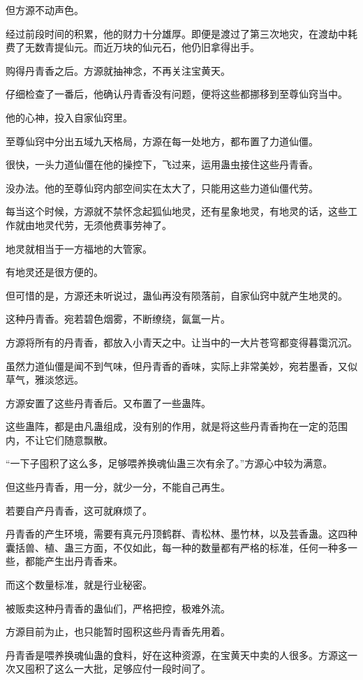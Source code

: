 \begin{this_body}
但方源不动声色。

经过前段时间的积累，他的财力十分雄厚。即便是渡过了第三次地灾，在渡劫中耗费了无数青提仙元。而近万块的仙元石，他仍旧拿得出手。

购得丹青香之后。方源就抽神念，不再关注宝黄天。

仔细检查了一番后，他确认丹青香没有问题，便将这些都挪移到至尊仙窍当中。

他的心神，投入自家仙窍里。

至尊仙窍中分出五域九天格局，方源在每一处地方，都布置了力道仙僵。

很快，一头力道仙僵在他的操控下，飞过来，运用蛊虫接住这些丹青香。

没办法。他的至尊仙窍内部空间实在太大了，只能用这些力道仙僵代劳。

每当这个时候，方源就不禁怀念起狐仙地灵，还有星象地灵，有地灵的话，这些工作就由地灵代劳，无须他费事劳神了。

地灵就相当于一方福地的大管家。

有地灵还是很方便的。

但可惜的是，方源还未听说过，蛊仙再没有陨落前，自家仙窍中就产生地灵的。

这种丹青香。宛若碧色烟雾，不断缭绕，氤氲一片。

方源将所有的丹青香，都放入小青天之中。让当中的一大片苍穹都变得暮霭沉沉。

虽然力道仙僵是闻不到气味，但丹青香的香味，实际上非常美妙，宛若墨香，又似草气，雅淡悠远。

方源安置了这些丹青香后。又布置了一些蛊阵。

这些蛊阵，都是由凡蛊组成，没有别的作用，就是将这些丹青香拘在一定的范围内，不让它们随意飘散。

“一下子囤积了这么多，足够喂养换魂仙蛊三次有余了。”方源心中较为满意。

但这些丹青香，用一分，就少一分，不能自己再生。

若要自产丹青香，这可就麻烦了。

丹青香的产生环境，需要有真元丹顶鹤群、青松林、墨竹林，以及芸香蛊。这四种囊括兽、植、蛊三方面，不仅如此，每一种的数量都有严格的标准，任何一种多一些，都能产生出丹青香来。

而这个数量标准，就是行业秘密。

被贩卖这种丹青香的蛊仙们，严格把控，极难外流。

方源目前为止，也只能暂时囤积这些丹青香先用着。

丹青香是喂养换魂仙蛊的食料，好在这种资源，在宝黄天中卖的人很多。方源这一次又囤积了这么一大批，足够应付一段时间了。


\end{this_body}

